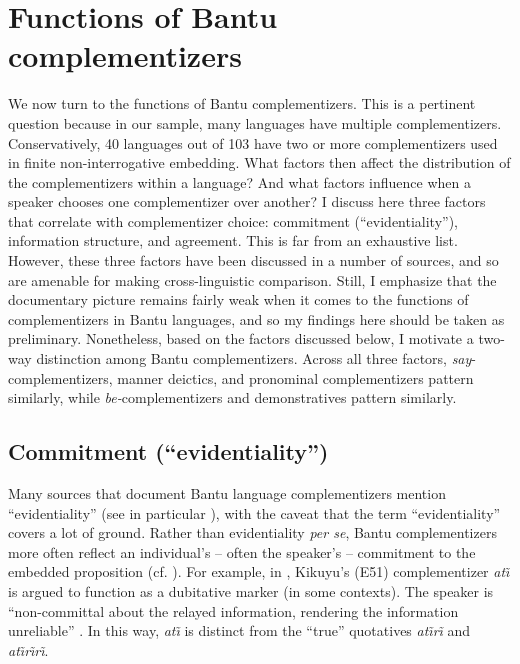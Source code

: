 \documentclass[output=paper,colorlinks,citecolor=brown,
]{langscibook}
\begin{document}
\section{Functions of Bantu complementizers}\label{sec:gluckman:factorsection}
We now turn to the functions of Bantu complementizers. This is a pertinent question because in our sample, many languages have multiple complementizers. Conservatively, 40 languages out of 103 have two or more complementizers used in finite non-interrogative embedding. What factors then affect the  distribution of the complementizers within a language? And what factors influence when a speaker chooses one complementizer over another? I discuss here three factors that correlate with complementizer choice: commitment (``evidentiality''), information structure, and agreement. This is far from an exhaustive list. However, these three factors have been  discussed in a number of sources, and so are amenable for making cross-linguistic comparison. Still, I emphasize that the documentary picture remains fairly weak when it comes to the functions of complementizers in Bantu languages, and so my findings here should be taken as preliminary. 
Nonetheless, based on the factors discussed below, I motivate a two-way distinction among Bantu complementizers. Across all three factors, \textit{say}-complementizers, manner deictics, and pronominal complementizers pattern similarly, while \textit{be-}complementizers and demonstratives pattern similarly. 

\subsection{Commitment (``evidentiality'')}\label{sec:gluckman:commitmentsection}

Many sources that document Bantu language complementizers mention ``evidentiality'' (see in particular \citealt{Botne:1995, Botne:2020}),   with the caveat that the term ``evidentiality'' covers a lot of ground. Rather than evidentiality \textsl{per se},  Bantu complementizers more often reflect an individual's -- often the speaker's -- commitment to the embedded proposition (cf. \citealt{Gluckman:2021syntax, Gluckman:2023}). For example, in \citet{Kihara:2017}, Kikuyu's (E51) complementizer \textit{at\~\i} is argued to function as a dubitative marker (in some contexts). The speaker is ``non-committal about the relayed information, rendering the information unreliable'' \citep[114]{Kihara:2017}. In this way, \textit{at\~\i} is distinct from the ``true'' quotatives \textit{at{\~\i}r{\~\i}} and \textit{at{\~\i}r{\~\i}r{\~\i}}.
\end{document}
